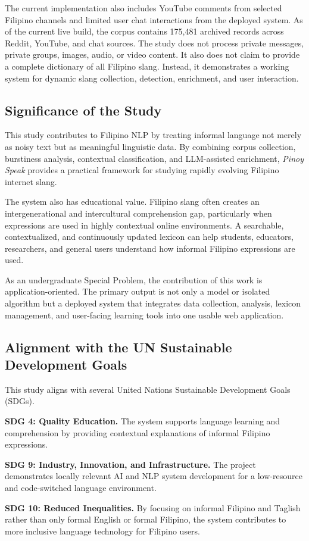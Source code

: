 The current implementation also includes YouTube comments from
selected Filipino channels and limited user chat interactions
from the deployed system. As of the current live build, the
corpus contains 175,481 archived records across Reddit,
YouTube, and chat sources. The study does not process private
messages, private groups, images, audio, or video content. It
also does not claim to provide a complete dictionary of all
Filipino slang. Instead, it demonstrates a working system for
dynamic slang collection, detection, enrichment, and user
interaction.

\subsection{Significance of the Study}

This study contributes to Filipino NLP by treating informal
language not merely as noisy text but as meaningful linguistic
data. By combining corpus collection, burstiness analysis,
contextual classification, and LLM-assisted enrichment,
\textit{Pinoy Speak} provides a practical framework for
studying rapidly evolving Filipino internet slang.

The system also has educational value. Filipino slang often
creates an intergenerational and intercultural comprehension
gap, particularly when expressions are used in highly
contextual online environments. A searchable, contextualized,
and continuously updated lexicon can help students, educators,
researchers, and general users understand how informal Filipino
expressions are used.

As an undergraduate Special Problem, the contribution of this
work is application-oriented. The primary output is not only a
model or isolated algorithm but a deployed system that
integrates data collection, analysis, lexicon management, and
user-facing learning tools into one usable web application.

\subsection{Alignment with the UN Sustainable Development Goals}

This study aligns with several United Nations Sustainable
Development Goals (SDGs).

\textbf{SDG 4: Quality Education.} The system supports language
learning and comprehension by providing contextual explanations
of informal Filipino expressions.

\textbf{SDG 9: Industry, Innovation, and Infrastructure.} The
project demonstrates locally relevant AI and NLP system
development for a low-resource and code-switched language
environment.

\textbf{SDG 10: Reduced Inequalities.} By focusing on informal
Filipino and Taglish rather than only formal English or formal
Filipino, the system contributes to more inclusive language
technology for Filipino users.
